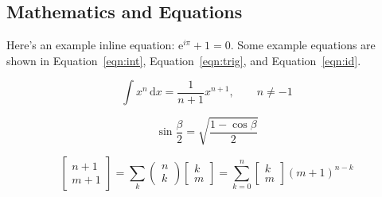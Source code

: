 \documentclass[aspectratio=169,xcolor={svgnames}]{beamer}
\begin{document}
\subsection{Mathematics and Equations}
\begin{frame}{\insertsubsectionhead}
  Here's an example inline equation: \(\textrm{e}^{i\pi} + 1 = 0\). Some
  example equations are shown in Equation~\ref{eqn:int},
  Equation~\ref{eqn:trig}, and Equation~\ref{eqn:id}.

  \begin{equation}
    \label{eqn:int}
    \int x^n\,\mathrm{d}x = \frac{1}{n + 1}x^{n + 1}, \qquad n \neq -1
  \end{equation}

  \begin{equation}
    \label{eqn:trig}
    \sin \frac{\beta}{2} = \sqrt{\frac{1 - \cos \beta}{2}}
  \end{equation}

  \begin{equation}
    \label{eqn:id}
    \begin{bmatrix}
      n + 1 \\
      m + 1
    \end{bmatrix}
    = \sum_k
    \begin{pmatrix}
      n \\
      k
    \end{pmatrix}
    \begin{bmatrix}
      k \\
      m
    \end{bmatrix}
    = \sum^n_{k = 0}
    \begin{bmatrix}
      k \\
      m
    \end{bmatrix}
    (m + 1)^{n -k}
  \end{equation}
\end{frame}

\end{document}
